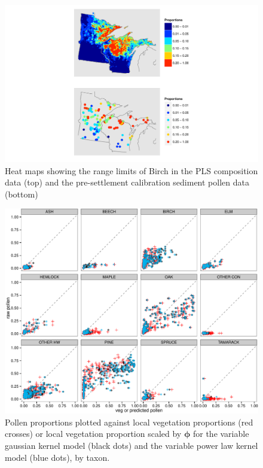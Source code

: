 \begin{figure}
\centering
\includegraphics[width=7in]{figures/maps_compare_BIRCH.pdf}
\caption{Heat maps showing the range limits of Birch in the PLS
  composition data (top) and the pre-settlement calibration sediment
  pollen data (bottom)}
\label{fig:compare_maps_BIRCH}
\end{figure}

\begin{figure}
\centering
\includegraphics[width=7in]{figures/pollen_phi_scaled_flexible.pdf}
\caption{Pollen proportions plotted against local vegetation proportions (red crosses) or local vegetation proportion scaled by $\bm{\phi}$ for the variable gaussian kernel model (black dots) and the variable power law kernel model (blue dots), by taxon.}
\label{fig:focal_scaled}
\end{figure}

